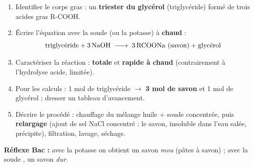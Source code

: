 \documentclass[11pt]{article}
\newcommand{\cle}[1]{{\popxbold\color{popdark}#1}}
\begin{document}
\begin{methode}
\begin{enumerate}
\item Identifier le \cle{corps gras} : un \textbf{triester du glycérol} (triglycéride) formé de trois acides gras R-COOH.
\item Écrire l'équation avec la soude (ou la potasse) à \textbf{chaud} :
\[ \text{triglycéride} + 3\,\ce{NaOH} \;\ce{->}\; 3\,\ce{RCOONa} \text{ (savon)} + \text{glycérol} \]
\item Caractériser la réaction : \textbf{totale} et \textbf{rapide à chaud} (contrairement à l'hydrolyse acide, limitée).
\item Pour les calculs : 1 mol de triglycéride $\to$ \textbf{3 mol de savon} et 1 mol de glycérol ; dresser un tableau d'avancement.
\item Décrire le procédé : chauffage du mélange huile + soude concentrée, puis \textbf{relargage} (ajout de sel NaCl concentré : le savon, insoluble dans l'eau salée, précipite), filtration, lavage, séchage.
\end{enumerate}
\textbf{Réflexe Bac :} avec la potasse  on obtient un savon \emph{mou} (pâtes à savon) ; avec la soude , un savon \emph{dur}.
\end{methode}
\end{document}
